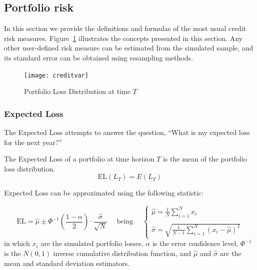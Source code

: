 \documentclass[11pt,fleqn]{book} %
\begin{document}
\subsection{Portfolio risk}

In this section we provide the definitions and formulas of the most usual 
credit risk measures. Figure~\ref{fig:lossdistr} illustrates the concepts 
presented in this section. Any other user-defined risk measure can be 
estimated from the simulated sample, and its standard error can be obtained 
using resampling methods.
\begin{figure}[!ht]
	\centering
	\texttt{[image: creditvar]}
	\caption{Portfolio Loss Distribution at time $T$}
	\label{fig:lossdistr}
\end{figure}


\subsubsection{Expected Loss}

The Expected Loss attempts to answer the question, ``What is my expected 
loss for the next year?''

\begin{definition}
	The Expected Loss of a portfolio at time horizon $T$ is the 
	mean of the portfolio loss distribution.
	\begin{displaymath}
		\text{EL}(L_T) = E(L_T)
	\end{displaymath}
\end{definition}

Expected Loss can be approximated using the following statistic:

\begin{displaymath}
	\text{EL} = \widehat{\mu} \pm \Phi^{-1}\left(\frac{1-\alpha}{2}\right) \cdot \frac{\widehat{\sigma}}{\sqrt{N}}
	\quad \text{ being } \quad
	\left\{
	\begin{array}{l}
		\displaystyle
		\widehat{\mu} = \frac{1}{N} \sum_{i=1}^{N} x_i \\
		\\
		\displaystyle
		\widehat{\sigma} =
		\sqrt{\frac{1}{N-1} \sum_{i=1}^{N} \left( x_i - \widehat{\mu} \right)^2}
	\end{array}
	\right.
\end{displaymath}
in which $x_i$ are the simulated portfolio losses, $\alpha$ is the error 
confidence level, $\Phi^{-1}$ is the $N(0,1)$ inverse cumulative distribution 
function, and $\widehat{\mu}$ and $\widehat{\sigma}$ are the mean and standard 
deviation estimators.
\end{document}
